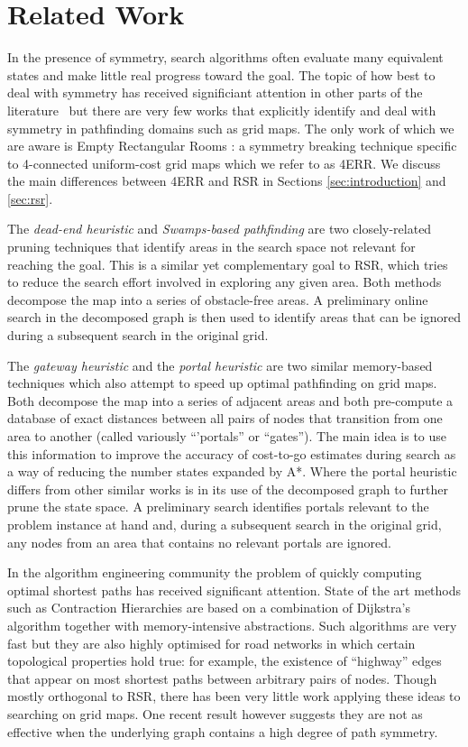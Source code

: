 \section{Related Work}
\label{sec:relatedwork}
In the presence of symmetry, search algorithms often
evaluate many equivalent states and make little real progress toward the goal.
The topic of how best to deal with symmetry has received significiant attention
in other parts of the literature~\cite{rossi06} but there are very few works
that explicitly identify and deal with symmetry in pathfinding domains 
such as grid maps. The only work of which we are aware is Empty Rectangular Rooms
\cite{harabor10}: a symmetry breaking technique specific to 4-connected
uniform-cost grid maps which we refer to as 4ERR.  We discuss the main
differences between 4ERR and RSR in Sections \ref{sec:introduction} and
\ref{sec:rsr}.
\par
The \emph{dead-end heuristic} \cite{bjornsson06} and \emph{Swamps-based
pathfinding} \cite{pochter10} are two closely-related pruning techniques
that identify areas in the search space not relevant for reaching the goal. 
This is a similar yet complementary goal
to RSR, which tries to reduce the search effort involved in exploring any given
area. Both methods decompose the map into a
series of obstacle-free areas. A preliminary
online search in the decomposed graph is then used to identify areas that can 
be ignored during a subsequent search in the original grid.
\par
The \emph{gateway heuristic} \cite{bjornsson06} and the \emph{portal heuristic}
\cite{goldenberg10} are two similar memory-based techniques which also attempt
to speed up optimal pathfinding on grid maps.  
Both decompose the map into a series of adjacent areas and both
pre-compute a database of exact distances between all pairs of nodes that transition 
from one area to another (called variously ``'portals'' or ``gates'').  
The main idea is to use this information to improve the accuracy of cost-to-go estimates
during search as a way of reducing the number states expanded by A*. 
Where the portal heuristic differs from other similar works
\cite{bjornsson06,sturtevant09} is in its use of the decomposed
graph to further prune the state space. A preliminary search 
identifies portals relevant to the problem instance at hand and, during 
a subsequent search in the original grid, 
any nodes from an area that contains no relevant portals are ignored.
\par
In the algorithm engineering community the problem of quickly computing optimal
shortest paths has received significant attention.  State of the art methods
such as Contraction Hierarchies \cite{geisberger08}
are based on a combination of Dijkstra's algorithm together with
memory-intensive abstractions. 
Such algorithms are very fast but they are also highly optimised for road
networks in which certain topological properties hold true: for example, the
existence of ``highway'' edges that appear on most shortest paths between
arbitrary pairs of nodes.  Though mostly orthogonal to RSR, there has been very
little work applying these ideas to searching on grid maps. One recent result
however \cite{sturtevant10} suggests they are not as effective when the
underlying graph contains a high degree of path symmetry.
